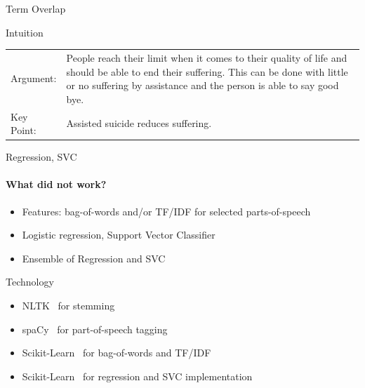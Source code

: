 \documentclass[english,handout]{mlutalk}
\newcommand{\TFIDF}{\mbox{TF/IDF}\xspace}
\begin{document}
\begin{frame}[allowframebreaks]{Term Overlap}
\begin{block}{Intuition}
    \begin{example}
      \smaller
      \begin{tabular}{lp{}}
        Argument: & People reach their limit when it comes to their quality of life and should be able to end their {\color{blue} suffering}. This can be done with little or no {\color{blue} suffering} by {\color{orange} assistance} and the person is able to say good bye. \\
        Key Point: & {\color{orange} Assisted} suicide reduces {\color{blue} suffering}.
      \end{tabular}
    \end{example}
  \end{block}

\end{frame}

\begin{frame}{Regression, SVC}
  
  \framesubtitle{What did not work?}
  
  \begin{itemize}
    \item Features: bag-of-words and/or \TFIDF for selected parts-of-speech
    \item Logistic regression, Support Vector Classifier
    \item Ensemble of Regression and SVC
  \end{itemize}
  
  \begin{block}{Technology}
      \begin{itemize}
        \item NLTK~\cite{Bird2006} for stemming
        \item spaCy~\cite{HonnibalMVLB2020} for part-of-speech tagging
        \item Scikit-Learn~\cite{PedregosaVGMTGBPWDVPCBPD2011} for bag-of-words and \TFIDF
        \item Scikit-Learn~\cite{PedregosaVGMTGBPWDVPCBPD2011} for regression and SVC implementation
      \end{itemize}
  \end{block}

\end{frame}
\end{document}
